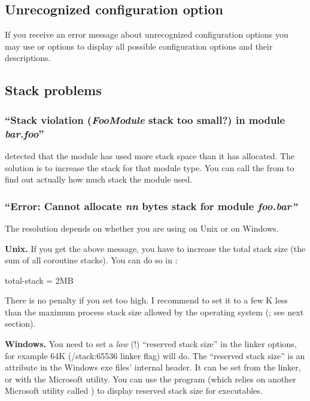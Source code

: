 \subsection{Unrecognized configuration option}

If you receive an error message about unrecognized configuration
options you may use  or  options
to display all possible configuration options and their descriptions.

\subsection{Stack problems}

\subsubsection{``Stack violation (\textit{FooModule} stack too small?) in module \textit{bar.foo}''}

{\opp} detected that the module has used more stack space than it has
allocated. The solution is to increase the stack for that module type.
You can call the  from  to find out
actually how much stack the module used.


\subsubsection{``Error: Cannot allocate \textit{nn} bytes stack for module \textit{foo.bar''}}

The resolution depends on whether you are using {\opp} on Unix or on Windows.

\textbf{Unix.}
If you get the above message, you have to increase the total stack
size (the sum of all coroutine stacks). You can do
so in :

\begin{inifile}
[General]
total-stack = 2MB
\end{inifile}

There is no penalty if you set  too high. I
recommend to set it to a few K less than the maximum process stack
size allowed by the operating system (; see
next section).


\textbf{Windows.}
You need to set a \textit{low} (!) ``reserved stack size''
in the linker options, for example 64K (/stack:65536 linker flag) will do.
The ``reserved stack size'' is an attribute in the Windows exe
files' internal header. It can be set from the linker, or with
the  Microsoft utility. You can use the 
program (which relies on another Microsoft utility called )
to display reserved stack size for executables.

